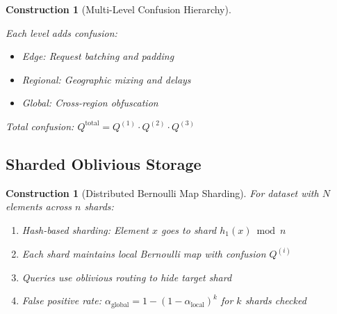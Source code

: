 \documentclass[11pt,final]{article}
\newtheorem{construction}[theorem]{Construction}
\begin{document}
\begin{construction}[Multi-Level Confusion Hierarchy]
\begin{center}
\end{center}

Each level adds confusion:
\begin{itemize}
    \item Edge: Request batching and padding
    \item Regional: Geographic mixing and delays
    \item Global: Cross-region obfuscation
\end{itemize}
Total confusion: $Q^{\text{total}} = Q^{(1)} \cdot Q^{(2)} \cdot Q^{(3)}$
\end{construction}

\subsection{Sharded Oblivious Storage}

\begin{construction}[Distributed Bernoulli Map Sharding]
For dataset with $N$ elements across $n$ shards:
\begin{enumerate}
    \item Hash-based sharding: Element $x$ goes to shard $h_1(x) \bmod n$
    \item Each shard maintains local Bernoulli map with confusion $Q^{(i)}$
    \item Queries use oblivious routing to hide target shard
    \item False positive rate: $\alpha_{\text{global}} = 1-(1-\alpha_{\text{local}})^k$ for $k$ shards checked
\end{enumerate}
\end{construction}
\end{document}
